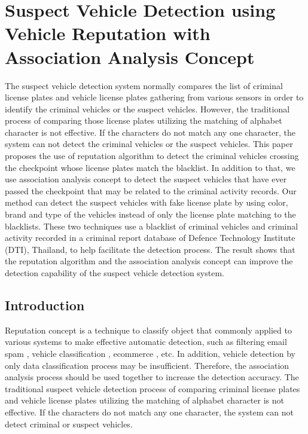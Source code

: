 %
%
%

\chapter{Suspect Vehicle Detection using Vehicle Reputation with Association Analysis Concept}
\label{intro} %

The suspect vehicle detection system normally compares the list of criminal license plates and vehicle license plates gathering from various sensors in order to identify the criminal vehicles or the suspect vehicles. 
However, the traditional process of comparing those license plates utilizing the matching of alphabet character is not effective. 
If the characters do not match any one character, the system can not detect the criminal vehicles or the suspect vehicles. 
This paper proposes the use of reputation algorithm to detect the criminal vehicles crossing the checkpoint whose license plates match the blacklist. 
In addition to that, we use association analysis concept to detect the suspect vehicles that have ever passed the checkpoint that may be related to the criminal activity records. 
Our method can detect the suspect vehicles with fake license plate by using color, brand and type of the vehicles instead of only the license plate matching to the blacklists.
These two techniques use a blacklist of criminal vehicles and criminal activity recorded in a criminal report database of Defence Technology Institute (DTI), Thailand, to help facilitate the detection process. 
The result shows that the reputation algorithm and the association analysis concept can improve the detection capability of the suspect vehicle detection system.

\section{Introduction}
\label{sec:1}
Reputation concept is a technique to classify object that commonly applied to various systems to make effective automatic detection, such as filtering email spam \cite{DBLP:taylor, lazzari}, vehicle classification \cite{ding,park}, ecommerce \cite{altman,page,resnick}, etc.
In addition, vehicle detection by only data classification process may be insufficient. Therefore, the association analysis process should be used together to increase the detection accuracy.
The traditional suspect vehicle detection process of comparing criminal license plates and vehicle license plates utilizing the matching of alphabet character is not effective. If the characters do not match any one character, the system can not detect criminal or suspect vehicles.


